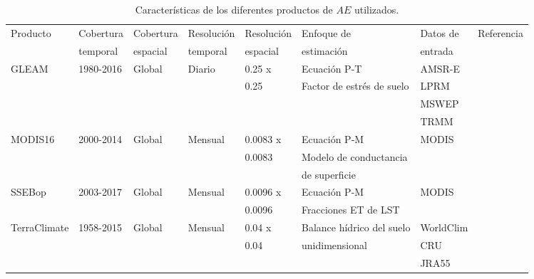 \begin{sidewaystable}
\caption{\label{tab:ETproducts} Características de los diferentes productos de $AE$ utilizados.}
\centering
\begin{tabular}{llllllll}
\hline 
Producto     & Cobertura & Cobertura & Resolución & Resolución & Enfoque de                & Datos de   & Referencia      \\
             & temporal  & espacial  & temporal   & espacial   & estimación                & entrada    &                 \\   \hline
GLEAM        & 1980-2016 & Global    & Diario     & 0.25 x     & Ecuación P-T              & AMSR-E     & \citet{Martens2017}     \\
             &           &           &            & 0.25       & Factor de estrés de suelo & LPRM       &                 \\
             &           &           &            &            &                           & MSWEP     &                 \\
             &           &           &            &            &                           & TRMM       &                 \\
MODIS16      & 2000-2014 & Global    & Mensual    & 0.0083 x   & Ecuación P-M              & MODIS      & \citet{mu2013modis}         \\
             &           &           &            & 0.0083     & Modelo de conductancia    &            &                 \\
             &           &           &            &            & de superficie             &            &                 \\
SSEBop       & 2003-2017 & Global    & Mensual    & 0.0096 x   & Ecuación P-M              & MODIS      & \citet{senay2011enhancing}      \\
             &           &           &            & 0.0096     & Fracciones ET de LST      &            &                 \\
TerraClimate & 1958-2015 & Global    & Mensual    & 0.04 x     & Balance hídrico del suelo & WorldClim  & \citet{abatzoglou2018terraclimate} \\
             &           &           &            & 0.04       & unidimensional            & CRU        &                 \\
             &           &           &            &            &                           & JRA55      &                 \\

\end{tabular}
\end{sidewaystable}
